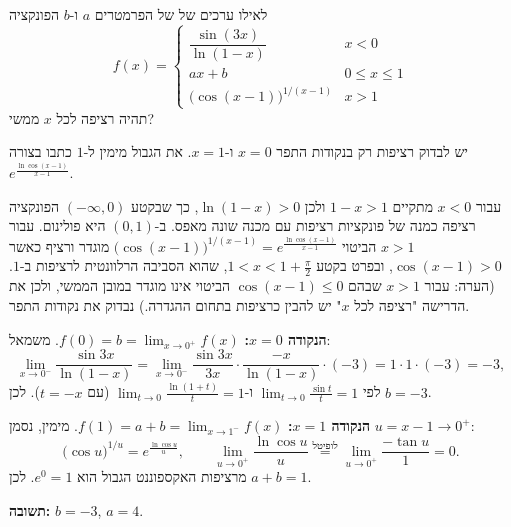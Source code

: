 
\begin{question}
לאילו ערכים של של הפרמטרים $a$ ו-$b$ הפונקציה
\[ f(x)=\begin{cases}\dfrac{\sin(3x)}{\ln(1-x)} & x<0\\[2mm] ax+b & 0\le x\le1\\[1mm] \big(\cos(x-1)\big)^{1/(x-1)} & x>1\end{cases} \]
תהיה רציפה לכל $x$ ממשי?
\end{question}

\begin{hint}
יש לבדוק רציפות רק בנקודות התפר $x=0$ ו-$x=1$. את הגבול מימין ל-$1$ כתבו בצורה $e^{\frac{\ln\cos(x-1)}{x-1}}$.
\end{hint}

\begin{solution}
עבור $x<0$ מתקיים $1-x>1$ ולכן $\ln(1-x)>0$, כך שבקטע $(-\infty,0)$ הפונקציה רציפה כמנה של פונקציות רציפות עם מכנה שונה מאפס. ב-$(0,1)$ היא פולינום. עבור $x>1$ הביטוי $\big(\cos(x-1)\big)^{1/(x-1)}=e^{\frac{\ln\cos(x-1)}{x-1}}$ מוגדר ורציף כאשר $\cos(x-1)>0$, ובפרט בקטע $1<x<1+\frac\pi2$, שהוא הסביבה הרלוונטית לרציפות ב-$1$. (הערה: עבור $x>1$ שבהם $\cos(x-1)\le0$ הביטוי אינו מוגדר במובן הממשי, ולכן את הדרישה "רציפה לכל $x$" יש להבין כרציפות בתחום ההגדרה.) נבדוק את נקודות התפר.

\textbf{הנקודה $x=0$:} $f(0)=b=\lim_{x\to0^+}f(x)$. משמאל:
\[ \lim_{x\to0^-}\frac{\sin3x}{\ln(1-x)}=\lim_{x\to0^-}\frac{\sin3x}{3x}\cdot\frac{-x}{\ln(1-x)}\cdot(-3)=1\cdot1\cdot(-3)=-3, \]
לפי $\lim_{t\to0}\frac{\sin t}{t}=1$ ו-$\lim_{t\to0}\frac{\ln(1+t)}{t}=1$ (עם $t=-x$). לכן $b=-3$.

\textbf{הנקודה $x=1$:} $f(1)=a+b=\lim_{x\to1^-}f(x)$. מימין, נסמן $u=x-1\to0^+$:
\[ \big(\cos u\big)^{1/u}=e^{\frac{\ln\cos u}{u}},\qquad \lim_{u\to0^+}\frac{\ln\cos u}{u}\overset{\text{לופיטל}}{=}\lim_{u\to0^+}\frac{-\tan u}{1}=0. \]
מרציפות האקספוננט הגבול הוא $e^0=1$. לכן $a+b=1$.

\textbf{תשובה:} $b=-3$, $a=4$.
\end{solution}
